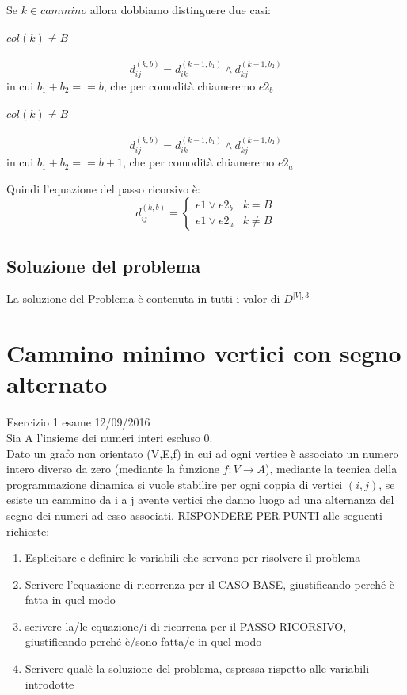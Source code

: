 \documentclass[12pt, a4paper, openany]{book}
\begin{document}
Se $k \in cammino$ allora dobbiamo distinguere due casi:
\paragraph{$col(k) \neq B$}
\begin{equation*}
	d_{ij}^{(k,b)} = d_{ik}^{(k-1,b_1)} \land d_{kj}^{(k-1,b_2)}
\end{equation*}
in cui $b_1 + b_2 == b$, che per comodità chiameremo $e2_b$
\paragraph{$col(k) \neq B$}
\begin{equation*}
	d_{ij}^{(k,b)} = d_{ik}^{(k-1,b_1)} \land d_{kj}^{(k-1,b_2)}
\end{equation*}
in cui $b_1 + b_2 == b+1$, che per comodità chiameremo $e2_a$

Quindi l'equazione del passo ricorsivo è:
\begin{equation*}
	d^{(k,b)}_{ij} = \begin{cases}
		e1 \lor e2_b & k=B     \\
		e1 \lor e2_a & k\neq B
	\end{cases}
\end{equation*}

\subsection*{Soluzione del problema}
La soluzione del Problema è contenuta in tutti i valor di $D^{|V|,3}$

\section{Cammino minimo vertici con segno alternato} Esercizio 1 esame 12/09/2016\\
Sia A l'insieme dei numeri interi escluso 0.\\
Dato un grafo non orientato (V,E,f) in cui ad ogni vertice è associato un numero intero
diverso da zero (mediante la funzione $f: V\rightarrow A$), mediante la tecnica della
programmazione dinamica si vuole stabilire per ogni coppia di vertici $(i,j)$, se esiste un
cammino da i a j avente vertici che danno luogo ad una alternanza del segno dei numeri
ad esso associati. RISPONDERE PER PUNTI alle seguenti richieste:
\begin{enumerate}
	\item Esplicitare e definire le variabili che servono per risolvere il problema
	\item Scrivere l'equazione di ricorrenza per il CASO BASE, giustificando perché è fatta in quel modo
	\item scrivere la/le equazione/i di ricorrena per il PASSO RICORSIVO, giustificando perché è/sono fatta/e in quel modo
	\item Scrivere qualè la soluzione del problema, espressa rispetto alle variabili introdotte
\end{enumerate}
\end{document}
